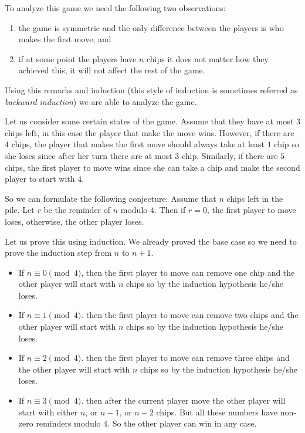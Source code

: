 To analyze this game we need the following two observations:
\begin{enumerate}
  \item the game is symmetric and the only difference between the players is
    who makes the first move, and
  \item if at some point the players have $n$ chips it does not matter how they
    achieved this, it will not affect the rest of the game.
\end{enumerate}
Using this remarks and induction (this style of induction is sometimes
referred as \emph{backward induction}) we are able to analyze the game.

Let us consider some certain states of the game.
Assume that they have at most $3$ chips left, in this case the player that make
the move wins. However, if there are $4$ chips, the
player that makes the first move should always take at least $1$ chip so she
loses since after her turn there are at most $3$ chip. Similarly, if there
are $5$ chips, the first player to move wins since she can take a chip and
make the second player to start with $4$.

So we can formulate the following conjecture.
Assume that $n$ chips left in the pile. Let $r$ be the reminder of $n$ modulo
$4$. Then if $r = 0$, the first player to move loses, otherwise, the other
player loses.

Let us prove this using induction. We already proved the base case so
we need to prove the induction step from $n$ to $n + 1$.
\begin{itemize}
  \item If $n \equiv 0 \pmod{4}$, then the first player to move can remove one
    chip and the other player will start with $n$ chips so by the induction
    hypothesis he/she loses.
  \item If $n \equiv 1 \pmod{4}$. then the first player to move can remove two
    chips and the other player will start with $n$ chips so by the induction
    hypothesis he/she loses.
  \item If $n \equiv 2 \pmod{4}$. then the first player to move can remove three
    chips and the other player will start with $n$ chips so by the induction
    hypothesis he/she loses.
  \item If $n \equiv 3 \pmod{4}$. then after the current player move the other
    player will start with either $n$, or $n - 1$, or $n - 2$ chips. But all
    these numbers have non-zero reminders modulo $4$. So the other player
    can win in any case.
\end{itemize}

